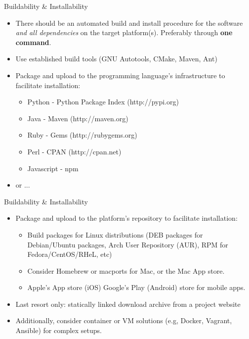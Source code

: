 \documentclass[compress]{beamer}
\begin{document}
\begin{frame}{Buildability \& Installability}
    \begin{itemize}
        \item There should be an automated build and install procedure for the software
            \emph{and all dependencies} on the target platform(s). Preferably
            through \textbf{one command}. 
        \item Use established build tools (GNU Autotools, CMake, Maven, Ant)
        \item Package and upload to the programming language's infrastructure to facilitate installation:
            \begin{itemize}
                \item Python - Python Package Index (http://pypi.org)
                \item Java - Maven (http://maven.org)
                \item Ruby - Gems (http://rubygems.org)
                \item Perl - CPAN (http://cpan.net)
                \item Javascript - npm
            \end{itemize}
        \item or  ...
    \end{itemize}
\end{frame}

\begin{frame}{Buildability \& Installability}
    \begin{itemize}
        \item Package and upload to the platform's repository to facilitate
            installation:
            \begin{itemize}
                \item Build packages for Linux distributions (DEB packages for
                        Debian/Ubuntu packages, Arch User Repository (AUR), RPM
                    for Fedora/CentOS/RHeL, etc)
                \item Consider Homebrew or macports for Mac, or the Mac App store.
                \item Apple's App store (iOS) Google's Play (Android) store for mobile apps.
            \end{itemize}        
        \item Last resort only: statically linked download archive from a project website
        \item Additionally, consider container or VM solutions (e.g, Docker, Vagrant, Ansible) for complex setups.
    \end{itemize}
\end{frame}
\end{document}
